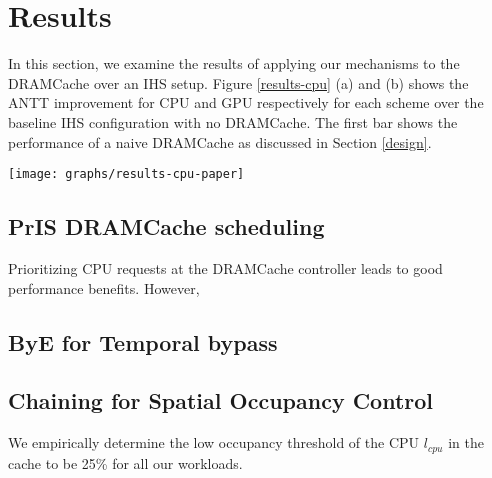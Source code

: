 \section{Results} \label{results}
In this section, we examine the results of applying our mechanisms to the DRAMCache over an IHS setup. Figure \ref{results-cpu} (a) and (b) shows the ANTT improvement for CPU and GPU respectively for each scheme over the baseline IHS configuration with no DRAMCache. The first bar shows the performance of a naive DRAMCache as discussed in Section \ref{design}. 
\begin{figure*}[!htb]
    \centering
    \texttt{[image: graphs/results-cpu-paper]}
    \label{results-graph}
\end{figure*}
\subsection{PrIS DRAMCache scheduling}
Prioritizing CPU requests at the DRAMCache controller leads to good performance benefits. However, 
\subsection{ByE for Temporal bypass}

\subsection{Chaining for Spatial Occupancy Control}
We empirically determine the low occupancy threshold of the CPU \textit{$l_{cpu}$} in the cache to be 25\% for all our workloads.
